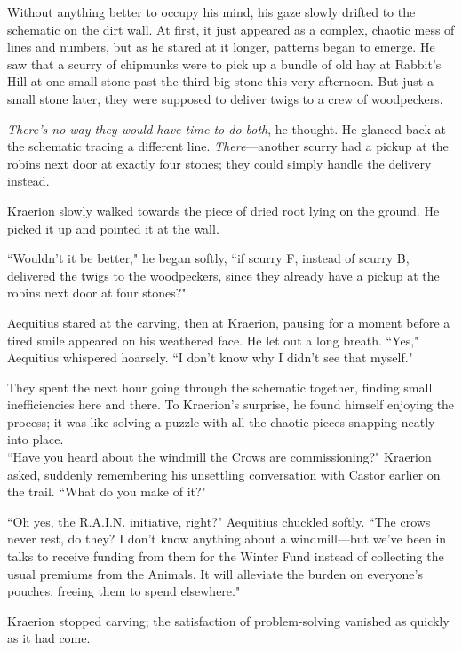 Without anything better to occupy his mind, his gaze slowly drifted to the schematic on the dirt wall.
At first, it just appeared as a complex, chaotic mess of lines and numbers, but as he stared at it longer, patterns began to emerge.
He saw that a scurry of chipmunks were to pick up a bundle of old hay at Rabbit's Hill at one small stone past the third big stone this very afternoon.
But just a small stone later, they were supposed to deliver twigs to a crew of woodpeckers.

\textit{There's no way they would have time to do both}, he thought.
He glanced back at the schematic tracing a different line. \textit{There}---another scurry had a pickup at the robins next door at exactly four stones; they could simply handle the delivery instead.

Kraerion slowly walked towards the piece of dried root lying on the ground.
He picked it up and pointed it at the wall.

``Wouldn't it be better," he began softly, ``if scurry F, instead of scurry B, delivered the twigs to the woodpeckers, since they already have a pickup at the robins next door at four stones?"

Aequitius stared at the carving, then at Kraerion, pausing for a moment before a tired smile appeared on his weathered face.
He let out a long breath.
``Yes," Aequitius whispered hoarsely.
``I don't know why I didn't see that myself."

They spent the next hour going through the schematic together, finding small inefficiencies here and there.
To Kraerion's surprise, he found himself enjoying the process; it was like solving a puzzle with all the chaotic pieces snapping neatly into place.\\

``Have you heard about the windmill the Crows are commissioning?" Kraerion asked, suddenly remembering his unsettling conversation with Castor earlier on the trail.
``What do you make of it?"

``Oh yes, the R.A.I.N. initiative, right?" Aequitius chuckled softly.
``The crows never rest, do they?
I don't know anything about a windmill---but we've been in talks to receive funding from them for the Winter Fund instead of collecting the usual premiums from the Animals.
It will alleviate the burden on everyone's pouches, freeing them to spend elsewhere."

Kraerion stopped carving; the satisfaction of problem-solving vanished as quickly as it had come.


